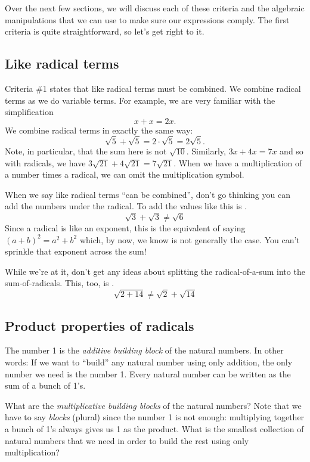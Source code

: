 Over the next few sections, we will discuss each of these criteria and the algebraic manipulations that we can use to make sure our expressions comply. The first criteria is quite straightforward, so let's get right to it.

\subsection{Like radical terms}

Criteria \#1 states that like radical terms must be combined. We combine radical terms as we do variable terms. For example, we are very familiar with the simplification \[x + x = 2x.\] We combine radical terms in exactly the same way: \[\sqrt5 + \sqrt5 = 2\cdot\sqrt5 = 2\sqrt5.\]
Note, in particular, that the sum here is not $\sqrt{10}$. Similarly, $3x + 4x = 7x$ and so with radicals, we have $3\sqrt{21} + 4\sqrt{21} = 7\sqrt{21}$. When we have a multiplication of a number times a radical, we can omit the multiplication symbol.


\begin{boxwarn}
When we say like radical terms ``can be combined'', don't go thinking you can add the numbers under the radical. To add the values like this is \evilandwrong.
\[ \sqrt{3} + \sqrt{3} \neq \sqrt{6}\]
Since a radical is like an exponent, this is the equivalent of saying $(a+b)^2=a^2+b^2$ which, by now, we know is not generally the case. You can't sprinkle that exponent across the sum!

While we're at it, don't get any ideas about splitting the radical-of-a-sum into the sum-of-radicals. This, too, is \evilandwrong.
\[\sqrt{2+14} \neq \sqrt{2} +\sqrt{14}\]
\end{boxwarn}


\subsection{Product properties of radicals}

\begin{boxexplore}
The number 1 is the \textit{additive building block} of the natural numbers. In other words: If we want to ``build'' any natural number using only addition, the only number we need is the number 1. Every natural number can be written as the sum of a bunch of 1's.

What are the \textit{multiplicative building blocks} of the natural numbers? Note that we have to say \textit{blocks} (plural) since the number 1 is not enough: multiplying together a bunch of 1's always gives us 1 as the product. What is the smallest collection of natural numbers that we need in order to build the rest using only multiplication?
\end{boxexplore}

